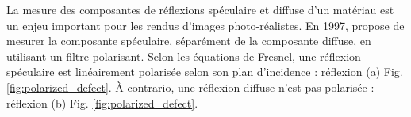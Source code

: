 
La mesure des composantes de réflexions spéculaire et diffuse d'un matériau est un enjeu important pour les rendus d'images photo-réalistes.
En 1997, \citeauthor{nayar_separation_1997} \cite{nayar_separation_1997} propose de mesurer la composante spéculaire, séparément de la composante diffuse, en utilisant un filtre polarisant.
Selon les équations de Fresnel, une réflexion spéculaire est linéairement polarisée selon son plan d'incidence : réflexion (a) Fig. \ref{fig:polarized_defect}.
À contrario, une réflexion diffuse n'est pas polarisée : réflexion (b) Fig. \ref{fig:polarized_defect}.


